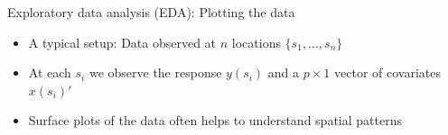 \documentclass[xcolor=pdftex,dvipsnames,table,numbers,hyperref={pdfpagelabels=false},compress]{beamer}
\begin{document}
\begin{frame}{Exploratory data analysis (EDA): Plotting the data}
	\begin{itemize}
		\item A typical setup: Data observed at $n$ locations $\{s_1,\ldots,s_n\}$
		\item At each $s_i$ we observe the response $y(s_i)$ and a $p\times 1$ vector of covariates $x(s_i)'$
		\item \alert{Surface plots} of the data often helps to understand spatial patterns
	\end{itemize}
	\vskip-7mm\begin{figure}

\end{figure}
\end{frame}
\end{document}
